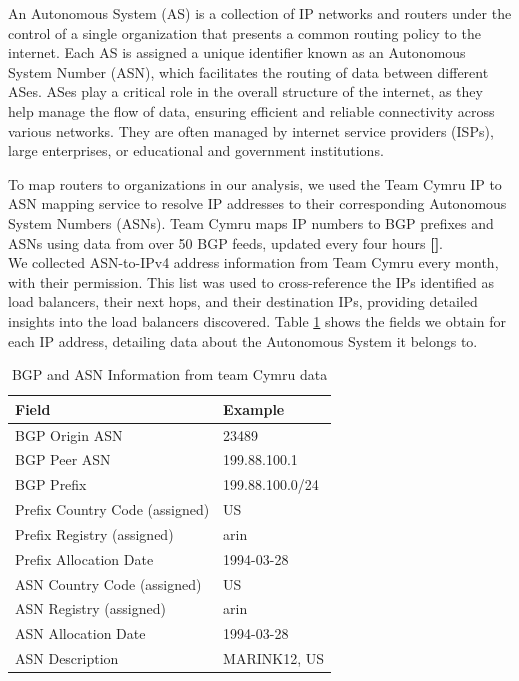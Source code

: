 \documentclass[12pt]{cwru_thesis}
\begin{document}
An Autonomous System (AS) is a collection of IP networks and routers under the control of a single organization that presents a common routing policy to the internet. Each AS is assigned a unique identifier known as an Autonomous System Number (ASN), which facilitates the routing of data between different ASes. ASes play a critical role in the overall structure of the internet, as they help manage the flow of data, ensuring efficient and reliable connectivity across various networks. They are often managed by internet service providers (ISPs), large enterprises, or educational and government institutions.

To map routers to organizations in our analysis, we used the Team Cymru IP to ASN mapping service to resolve IP addresses to their corresponding Autonomous System Numbers (ASNs). Team Cymru maps IP numbers to BGP prefixes and ASNs using data from over 50 BGP feeds, updated every four hours \textbf{[\cite{teamcymru2023ipasn}]}.\\  


 
 We collected ASN-to-IPv4 address information from Team Cymru every month, with their permission. This list was used to cross-reference the IPs identified as load balancers, their next hops, and their destination IPs, providing detailed insights into the load balancers discovered. Table \ref{tab:bgp_asn_info} shows the fields we obtain for each IP address, detailing data about  the Autonomous System it belongs to. 

\begin{table}[h]
    \centering
    \begin{tabular}{|l|l|}
        \hline
        \textbf{Field} & \textbf{Example} \\
        \hline
        BGP Origin ASN & 23489 \\
        \hline
        BGP Peer ASN & 199.88.100.1 \\
        \hline
        BGP Prefix & 199.88.100.0/24 \\
        \hline
        Prefix Country Code (assigned) & US \\
        \hline
        Prefix Registry (assigned) & arin \\
        \hline
        Prefix Allocation Date & 1994-03-28 \\
        \hline
        ASN Country Code (assigned) & US \\
        \hline
        ASN Registry (assigned) & arin \\
        \hline
        ASN Allocation Date & 1994-03-28 \\
        \hline
        ASN Description & MARINK12, US \\
        \hline
    \end{tabular}
    \caption{BGP and ASN Information from team Cymru data}
    \label{tab:bgp_asn_info}
\end{table}
\end{document}

